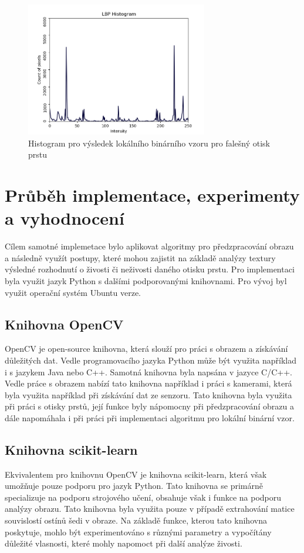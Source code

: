 \begin{figure}[htbp]
    \centering
    \includegraphics[width=300px]{obrazky-figures/histfake.png}
    \caption{Histogram pro výsledek lokálního binárního vzoru pro falešný otisk prstu}
\end{figure}

\chapter{Průběh implementace, experimenty a vyhodnocení}
Cílem samotné implemetace bylo aplikovat algoritmy pro předzpracování obrazu a následně využít postupy, které mohou zajistit na základě analýzy textury výsledné rozhodnutí o živosti či neživosti daného otisku prstu.
Pro implementaci byla využit jazyk Python s dalšími podporovanými knihovnami. Pro vývoj byl využit operační systém Ubuntu verze.

\section{Knihovna OpenCV}
OpenCV je open-source knihovna, která slouží pro práci s obrazem a získávání důležitých dat. Vedle programovacího jazyka Python může být využita například i s jazykem Java nebo C++. Samotná knihovna byla napsána v jazyce C/C++.\cite{OpenCVLibrary} Vedle práce s obrazem nabízí tato knihovna například i práci s kamerami, která byla využita například při získávání dat ze senzoru. Tato knihovna byla využita při práci s otisky prstů, její funkce byly nápomocny při předzpracování obrazu a dále napomáhala i při práci při implementaci algoritmu pro lokální binární vzor.

\section{Knihovna scikit-learn}
Ekvivalentem pro knihovnu OpenCV je knihovna scikit-learn, která však umožňuje pouze podporu pro jazyk Python. Tato knihovna se primárně specializuje na podporu strojového učení, obsahuje však i funkce na podporu analýzy obrazu. Tato knihovna byla využita pouze v případě extrahování matice souvislostí ostínů šedi v obraze. Na základě funkce, kterou tato knihovna poskytuje, mohlo být experimentováno s různými parametry a vypočítány důležité vlasnosti, které mohly napomoct při další analýze živosti.


